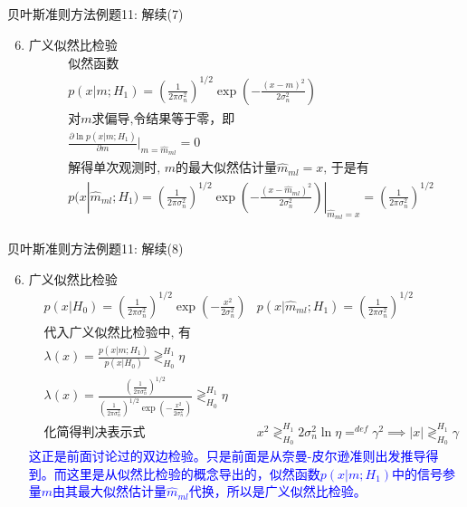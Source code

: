 \begin{frame}[shrink]{贝叶斯准则方法例题11: 解续(7)}
\begin{enumerate}
	\setcounter{enumi}{5} %
	\item 广义似然比检验\\
	\begin{align*}
	&\text{似然函数}\\
	&p(x|m;H_1)=(\frac{1}{2\pi\sigma_n^2})^{1/2}\exp(-\frac{(x-m)^2}{2\sigma_n^2})\\
	&\text{对$m$求偏导,令结果等于零，即} \\
	&\frac{\partial\ln p(x|m;H_1)}{\partial m}|_{m=\widehat{m}_{ml}}=0\\
	&\text{解得单次观测时, $m$的最大似然估计量$\widehat{m}_{ml}=x$, 于是有 }\\
	&p(x|\widehat{m}_{ml};H_1)=(\frac{1}{2\pi\sigma_n^2})^{1/2}\exp(-\frac{(x-\widehat{m}_{ml})^2}{2\sigma_n^2})|_{\widehat{m}_{ml}=x}=(\frac{1}{2\pi\sigma_n^2})^{1/2}\\
	\end{align*}
\end{enumerate} 
\end{frame}

\begin{frame}[shrink]{贝叶斯准则方法例题11: 解续(8)}
\begin{enumerate}
	\setcounter{enumi}{5} %
	\item 广义似然比检验\\
	\begin{align*}
	&p(x|H_0)=(\frac{1}{2\pi\sigma_n^2})^{1/2}\exp(-\frac{x^2}{2\sigma_n^2})
	&p(x|\widehat{m}_{ml};H_1)=(\frac{1}{2\pi\sigma_n^2})^{1/2}\\
	&\text{代入广义似然比检验中, 有}\\
	&\lambda(x)=\frac{p(x|m; H_1)}{p(x|H_0)}\mathop{\gtrless}_{H_0}^{H_1}\eta\\
	&\lambda(x)=\frac{(\frac{1}{2\pi\sigma_n^2})^{1/2}}{(\frac{1}{2\pi\sigma_n^2})^{1/2}\exp(-\frac{x^2}{2\sigma_n^2})}\mathop{\gtrless}_{H_0}^{H_1}\eta\\
	&\text{化简得判决表示式}
	&x^2\mathop{\gtrless}_{H_0}^{H_1}2\sigma_n^2\ln\eta\mathop{=}^{def}\gamma^2 \implies |x|\mathop{\gtrless}_{H_0}^{H_1}\gamma
	\end{align*}
	\textcolor{blue}{这正是前面讨论过的双边检验。只是前面是从奈曼-皮尔逊准则出发推导得到。而这里是从似然比检验的概念导出的，似然函数$p(x|m;H_1)$中的信号参量$m$由其最大似然估计量$\widehat{m}_{ml}$代换，所以是广义似然比检验。}
\end{enumerate} 
\end{frame}

